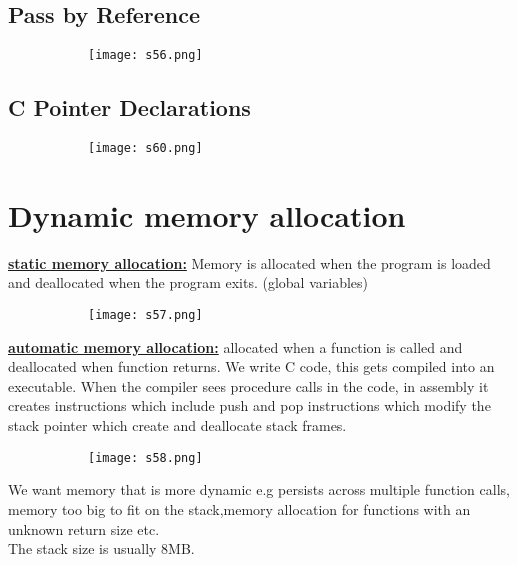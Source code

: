 \documentclass[8pt]{extreport}
\begin{document}
\section{Pass by Reference }
\begin{figure}[H]
\centering
\begin{subfigure}[b]{0.4\linewidth}
\texttt{[image: s56.png]}
\end{subfigure}
\end{figure}

\section{C Pointer Declarations}
\begin{figure}[H]
\centering
\begin{subfigure}[b]{0.4\linewidth}
\texttt{[image: s60.png]}
\end{subfigure}
\end{figure}

\chapter{Dynamic memory allocation}

\textbf{\underline{ static memory allocation:}} Memory is allocated when the program is loaded and deallocated when the program exits. (global variables)
\begin{figure}[H]
\centering
\begin{subfigure}[b]{0.4\linewidth}
\texttt{[image: s57.png]}
\end{subfigure}
\end{figure}
\textbf{\underline{ automatic memory allocation:}} allocated when a function is called and deallocated when function returns. We write C code, this gets compiled into an executable. When the compiler sees procedure calls in the code, in assembly it creates instructions which include push and pop instructions which modify the stack pointer which create and deallocate stack frames.
\begin{figure}[H]
\centering
\begin{subfigure}[b]{0.4\linewidth}
\texttt{[image: s58.png]}
\end{subfigure}
\end{figure}
We want memory that is more dynamic e.g persists across multiple function calls, memory too big to fit on the stack,memory allocation for functions with an unknown return size etc.\\
The stack size is usually 8MB.
\end{document}
